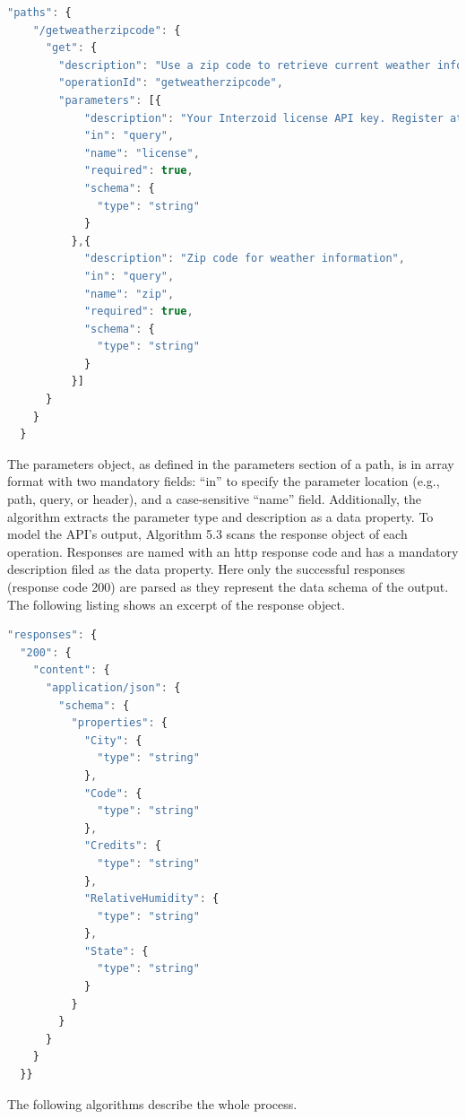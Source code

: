 \begin{lstlisting}[language=JavaScript, captionpos=t, caption=Snippet of the Paths Object from the Interzoid API’s Specification]
"paths": {
    "/getweatherzipcode": {
      "get": {
        "description": "Use a zip code to retrieve current weather information",
        "operationId": "getweatherzipcode",
        "parameters": [{
            "description": "Your Interzoid license API key. Register at www.interzoid.com/register",
            "in": "query",
            "name": "license",
            "required": true,
            "schema": {
              "type": "string"
            }
          },{
            "description": "Zip code for weather information",
            "in": "query",
            "name": "zip",
            "required": true,
            "schema": {
              "type": "string"
            }
          }]
      }
    }
  }
\end{lstlisting}

The parameters object, as defined in the parameters section of a path, is in array format with two mandatory fields: “in” to specify the parameter location (e.g., path, query, or header), and a case-sensitive “name” field. Additionally, the algorithm extracts the parameter type and description as a data property. To model the API’s output, Algorithm 5.3 scans the response object of each operation. Responses are named with an \gls{http} response code and has a mandatory description filed as the data property. Here only the successful responses (response code 200) are parsed as they represent the data schema of the output. The following listing shows an excerpt of the response object.

\begin{lstlisting}[language=JavaScript, captionpos=t, caption=Snippet of the Response Object from the Interzoid API’s Specification]
"responses": {
  "200": {
    "content": {
      "application/json": {
        "schema": {
          "properties": {
            "City": {
              "type": "string"
            },
            "Code": {
              "type": "string"
            },
            "Credits": {
              "type": "string"
            },
            "RelativeHumidity": {
              "type": "string"
            },
            "State": {
              "type": "string"
            }
          }
        }
      }
    }
  }}
\end{lstlisting}
The following algorithms describe the whole process.

\setlength{\algomargin}{2em} %

